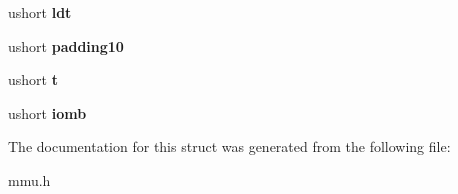 \begin{DoxyCompactItemize}
\item 
ushort {\bfseries ldt}\hypertarget{structtaskstate_a960e5d4a40dcafb35f32ec047c0ca147}{}\label{structtaskstate_a960e5d4a40dcafb35f32ec047c0ca147}

\item 
ushort {\bfseries padding10}\hypertarget{structtaskstate_a6f95dd6d0ae39afaaf5ee8671220b00b}{}\label{structtaskstate_a6f95dd6d0ae39afaaf5ee8671220b00b}

\item 
ushort {\bfseries t}\hypertarget{structtaskstate_ad9d64e6139f851a3f8d2275f2748fae5}{}\label{structtaskstate_ad9d64e6139f851a3f8d2275f2748fae5}

\item 
ushort {\bfseries iomb}\hypertarget{structtaskstate_a5ee57b190324239a5d88f7c02039901f}{}\label{structtaskstate_a5ee57b190324239a5d88f7c02039901f}

\end{DoxyCompactItemize}


The documentation for this struct was generated from the following file\+:\begin{DoxyCompactItemize}
\item 
mmu.\+h\end{DoxyCompactItemize}
